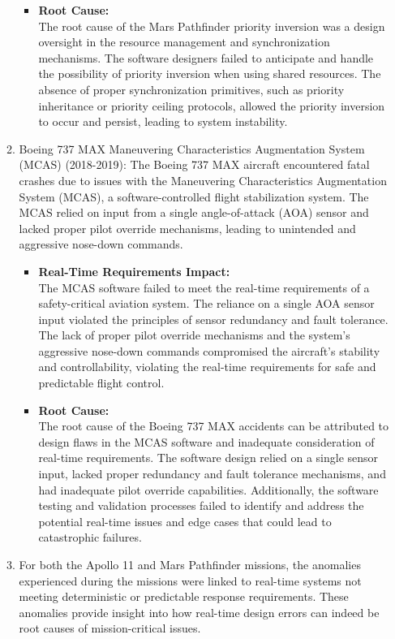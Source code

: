 \documentclass[a4paper,11pt]{article}%
\newenvironment{qanda}{\setlength{\parindent}{0pt}}{\bigskip}
\begin{document}
\begin{qanda}
\begin{enumerate}
\begin{enumerate}
\begin{itemize}
					      \item \textbf{Root Cause:}\\
					            The root cause of the Mars Pathfinder priority inversion was a design oversight in the resource management and synchronization mechanisms. The software designers failed to anticipate and handle the possibility of priority inversion when using shared resources. The absence of proper synchronization primitives, such as priority inheritance or priority ceiling protocols, allowed the priority inversion to occur and persist, leading to system instability.
				      \end{itemize}
				\item Boeing 737 MAX Maneuvering Characteristics Augmentation System (MCAS) (2018-2019): The Boeing 737 MAX aircraft encountered fatal crashes due to issues with the Maneuvering Characteristics Augmentation System (MCAS), a software-controlled flight stabilization system. The MCAS relied on input from a single angle-of-attack (AOA) sensor and lacked proper pilot override mechanisms, leading to unintended and aggressive nose-down commands.
				      \begin{itemize}
					      \item \textbf{Real-Time Requirements Impact:}\\
					            The MCAS software failed to meet the real-time requirements of a safety-critical aviation system. The reliance on a single AOA sensor input violated the principles of sensor redundancy and fault tolerance. The lack of proper pilot override mechanisms and the system's aggressive nose-down commands compromised the aircraft's stability and controllability, violating the real-time requirements for safe and predictable flight control.

					      \item \textbf{Root Cause:}\\
					            The root cause of the Boeing 737 MAX accidents can be attributed to design flaws in the MCAS software and inadequate consideration of real-time requirements. The software design relied on a single sensor input, lacked proper redundancy and fault tolerance mechanisms, and had inadequate pilot override capabilities. Additionally, the software testing and validation processes failed to identify and address the potential real-time issues and edge cases that could lead to catastrophic failures.
				      \end{itemize}
				\item For both the Apollo 11 and Mars Pathfinder missions, the anomalies experienced during the missions were linked to real-time systems not meeting deterministic or predictable response requirements. These anomalies provide insight into how real-time design errors can indeed be root causes of mission-critical issues.\\\\


\end{enumerate}
\end{enumerate}
\end{qanda}
\end{document}
